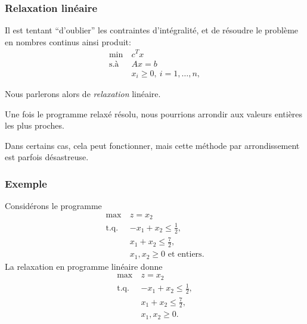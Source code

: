 \documentclass[usepdftitle=false, aspectratio=169]{beamer}
\def\st{\mbox{t.q. }}
\begin{document}
\begin{frame}
\frametitle{Relaxation linéaire}


Il est tentant ``d'oublier'' les contraintes d'intégralité, et de résoudre le problème en nombres continus ainsi produit:
\begin{equation}
	\begin{aligned}
	\min\ & c^Tx \\
	\mbox{s.à } & Ax = b \\
	& x_i \geq 0,\ i = 1,\ldots,n,
\end{aligned}
\tag{PL}
\label{eq:PL}
\end{equation}

Nous parlerons alors de {\sl relaxation} linéaire.

\mbox{}

Une fois le programme relaxé résolu, nous pourrions arrondir aux valeurs entières les plus proches.

\mbox{}

Dans certains cas, cela peut fonctionner, mais
cette méthode par arrondissement est parfois désastreuse.

\end{frame}

\begin{frame}
\frametitle{Exemple}

Considérons le programme
\begin{align*}
\max\ & z = x_2\\
\st & -x_1+x_2 \leq \frac{1}{2}, \\
& x_1 + x_2 \leq \frac{7}{2}, \\
& x_1, x_2 \geq 0 \mbox{ et entiers}.
\end{align*}
La relaxation en programme linéaire donne
\begin{align*}
\max\ & z = x_2\\
\st & -x_1+x_2 \leq \frac{1}{2}, \\
& x_1 + x_2 \leq \frac{7}{2}, \\
& x_1, x_2 \geq 0.
\end{align*}

\end{frame}
\end{document}
